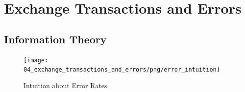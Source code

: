 \section{Exchange Transactions and Errors}
\label{section:exchange_transactions_and_errors}

% 
% 

\subsection{Information Theory}

\begin{figure}[H]
\centering
\texttt{[image: 04\_exchange\_transactions\_and\_errors/png/error\_intuition]}
\caption{Intuition about Error Rates}
\label{fig:error_intuition}
\end{figure}

